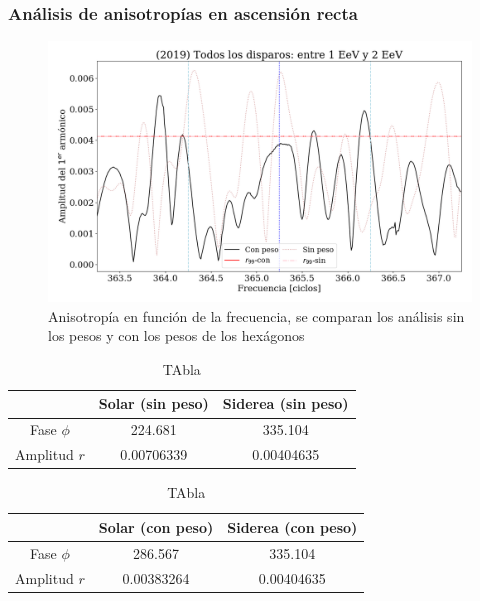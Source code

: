 	\subsubsection{Análisis de anisotropías en ascensión recta}
		
		\begin{figure}[H]
			\centering
			\includegraphics[width=\linewidth]{pesos_sin_con_1_2_EeV.png}
			\caption{Anisotropía en función de la frecuencia, se comparan los análisis sin los pesos y con los pesos de los hexágonos}
		\end{figure}
		
		
		\begin{table}[H]
		\centering
		\begin{tabular}{c|c|c}
					& Solar (sin peso)		& Siderea (sin peso)  \\ \hline
		Fase $\phi$ & 224.681	    		& 335.104			\\
		Amplitud $r$& 0.00706339	    	&0.00404635			\\
		\end{tabular}
		\caption{TAbla}
		
		\end{table}
		
		\begin{table}[H]
		\centering
		\begin{tabular}{c|c|c}
					& Solar (con peso)		& Siderea (con peso)  \\ \hline
		Fase $\phi$ & 286.567	    	& 335.104			\\
		Amplitud $r$& 0.00383264	    &0.00404635			\\
		\end{tabular}
		\caption{TAbla}
		\end{table}
		
		
